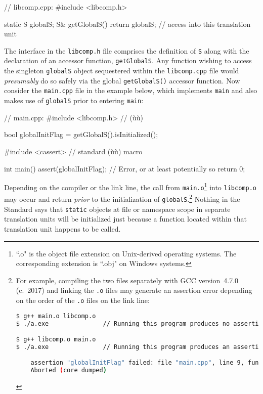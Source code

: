 
\begin{emcppslisting}[emcppsbatch=e7]
// libcomp.cpp:
#include <libcomp.h>

static S globalS;
S& getGlobalS() { return globalS; }  // access into this translation unit
\end{emcppslisting}

\noindent The interface in the \lstinline!libcomp.h! file comprises the definition of
\lstinline!S! along with the declaration of an accessor function,
\lstinline!getGlobalS!. Any function wishing to access the singleton
\lstinline!globalS! object sequestered within the \lstinline!libcomp.cpp! file
would \emph{presumably} do so safely via the global
\lstinline!getGlobalS()! accessor function. Now consider the
\lstinline!main.cpp! file in the example below, which implements
\lstinline!main! and also makes use of \lstinline!globalS! prior to entering
\lstinline!main!:

\begin{emcppslisting}[emcppsbatch=e7]
// main.cpp:
#include <libcomp.h>  // (ù{}ù)

bool globalInitFlag = getGlobalS().isInitialized();

#include <cassert>  // standard (ù{}ù) macro

int main()
{
    assert(globalInitFlag);   // Error, or at least potentially so
    return 0;
}
\end{emcppslisting}

\noindent Depending on the compiler or the link line, the call from \lstinline!main.o!\footnote{``.o" is the object file extension on Unix-derived operating systems. The corresponding extension is ``.obj" on Windows systems.} into \lstinline!libcomp.o! may occur and
return \emph{prior} to the initialization of
\lstinline!globalS!.{\cprotect\footnote{For example, compiling the two
files separately with GCC version~4.7.0 (c.~2017) and linking the
\lstinline!.o! files may generate an assertion error depending on the
order of the \lstinline!.o! files on the link line:

\begin{lstlisting}[language=bash,basicstyle={\ttfamily\footnotesize}]
$ g++ main.o libcomp.o
$ ./a.exe               // Running this program produces no assertion failure.

$ g++ libcomp.o main.o
$ ./a.exe               // Running this program produces an assertion failure.

    assertion "globalInitFlag" failed: file "main.cpp", line 9, function: int main()
    Aborted (core dumped)
\end{lstlisting}
      }} Nothing in the Standard says that \lstinline!static! objects at
file or namespace scope in separate translation units will be
initialized just because a function located within that translation unit
happens to be called.

